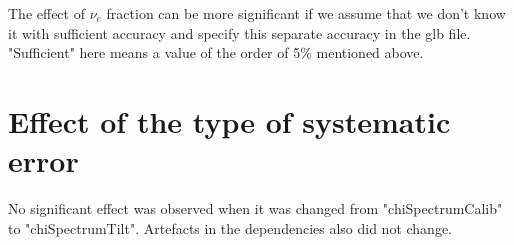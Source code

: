 \documentclass[prd,showpacs,groupedaddress,superscriptaddress,amsmath,amssymb]{revtex4-2} %
\begin{document}
The effect of $\nu_e$ fraction can be more significant if we assume that we don't know it with sufficient accuracy and specify this separate accuracy
in the glb file. "Sufficient" here means a value of the order of 5\% mentioned above.


\section{Effect of the type of systematic error}


No significant effect was observed when it was changed from "chiSpectrumCalib" to "chiSpectrumTilt". Artefacts in the dependencies also did not change.



\clearpage


\end{document}
